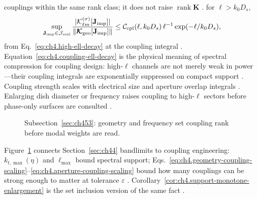 couplings within the same rank class; it does not raise \(\operatorname{rank}\mathbf{K}\) \cite{stratton1941}.
for \(\ell>k_{0}D_{s}\),
\begin{equation}
\label{eq:ch4.coupling-ell-decay}
\sup_{\mathbf{J}_{\mathrm{imp}}\in\mathcal{J}_{\mathrm{real}}}
\frac{|\mathcal{K}_{\ell m}^{(\sigma)}[\mathbf{J}_{\mathrm{imp}}]|}
{\|\boldsymbol{\mathcal{K}}_{\mathrm{geo}}[\mathbf{J}_{\mathrm{imp}}]\|}
\le
\mathcal{C}_{\mathrm{cpl}}(\ell,k_{0}D_{s})\,
\ell^{-1}\exp(-\ell/k_{0}D_{s}),
\end{equation}
from Eq.~\eqref{eq:ch4.high-ell-decay} at the coupling integral \cite{hansen1988}.
Equation~\eqref{eq:ch4.coupling-ell-decay} is the physical meaning of spectral compression for coupling design: high-\(\ell\)
channels are not merely weak in power---their coupling integrals are exponentially suppressed on compact support
\cite{harrington2001}.
Coupling strength scales with electrical size and aperture overlap integrals \cite{stratton1941}. Enlarging dish diameter or frequency raises coupling to high-$\ell$ sectors before phase-only surfaces are consulted \cite{harrington2001}.
\begin{figure}[t]
\centering
{}
\caption{Subsection~\ref{sec:ch453}: geometry and frequency set coupling rank before modal weights are read.}
\label{fig:ch4.geometry-coupling-scaling}
\end{figure}
Figure~\ref{fig:ch4.geometry-coupling-scaling} connects Section~\ref{sec:ch44} bandlimits to coupling engineering:
\(k_{t,\max}(\eta)\) and \(\ell_{\max}\) bound spectral support; Eqs.~\eqref{eq:ch4.geometry-coupling-scaling}--\eqref{eq:ch4.aperture-coupling-scaling}
bound how many couplings can be strong enough to matter at tolerance \(\varepsilon\) \cite{hansen1988}.
Corollary~\ref{cor:ch4.support-monotone-enlargement} is the set inclusion version of the same fact
\cite{stratton1941}.

